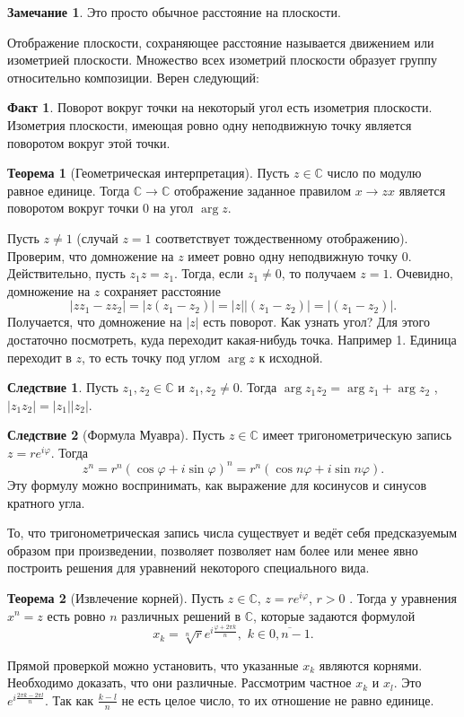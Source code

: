 \documentclass[10pt,a4paper,oneside]{book}
\theoremstyle{definition}
\newtheorem*{rem}{Замечание}
\newtheorem*{fact}{Факт}
\newtheorem{thm}{Теорема}
\newtheorem{cor}{Следствие}
\newcommand{\mb}[1]{\mathbb{#1}}
\newcommand{\ovl}{\overline}
\def\thrm{\begin{thm}}
\def\ethrm{\end{thm}}
\def\crl{\begin{cor}}
\def\ecrl{\end{cor}}
\def\rm{\begin{rem}}
\def\erm{\end{rem}}
\begin{document}
\rm Это просто обычное расстояние на плоскости.
\erm

Отображение плоскости, сохраняющее расстояние называется движением или изометрией плоскости. Множество всех изометрий плоскости образует группу относительно композиции. Верен следующий:
\begin{fact} Поворот вокруг точки на некоторый угол есть изометрия плоскости. Изометрия плоскости, имеющая ровно
одну неподвижную точку является поворотом вокруг этой точки.
\end{fact}

\thrm[Геометрическая интерпретация] Пусть $z\in \mb C$ число по модулю равное единице. Тогда $\mb C \to \mb C$ отображение заданное правилом $ x\to zx$   является поворотом вокруг точки 0 на угол $\arg z$.
\ethrm
\proof Пусть $z\neq 1$ (случай $z=1$ соответствует тождественному отображению). Проверим, что домножение на $z$ имеет ровно одну неподвижную точку 0. Действительно, пусть $z_1z=z_1$. Тогда, если $z_1\neq 0$, то получаем $z=1$. Очевидно, домножение на $z$ сохраняет расстояние $$|zz_1-zz_2|=|z(z_1-z_2)|=|z||(z_1-z_2)|=|(z_1-z_2)|.$$
Получается, что домножение на $|z|$ есть поворот. Как узнать угол? Для этого достаточно посмотреть, куда переходит какая-нибудь точка. Например 1. Единица переходит в $z$, то есть точку под углом $\arg z$ к исходной.
\endproof

\crl Пусть $z_1, z_2\in \mb C$  и $z_1,z_2\neq 0$. Тогда $\arg z_1z_2 = \arg z_1 + \arg z_2$ , $|z_1z_2| = |z_1 ||z_2 |$.
\ecrl

\crl[Формула Муавра] Пусть $z\in \mb C$ имеет тригонометрическую запись $z=re^{i\varphi}$. Тогда
$$z^{n}=r^{n}(\cos \varphi +i\sin \varphi )^{n}=r^{n}(\cos n\varphi +i\sin n\varphi ).$$
Эту формулу можно воспринимать, как выражение для косинусов и синусов кратного угла.
\ecrl

То, что тригонометрическая запись числа существует и ведёт себя предсказуемым образом при произведении, позволяет позволяет нам более или менее явно построить решения для уравнений некоторого специального вида.

\thrm[Извлечение корней] Пусть $z\in \mb C$, $z=re^{i\varphi}$, $r>0$ . Тогда у уравнения $x^n=z$ есть ровно $n$ различных
решений в $\mb C$, которые задаются формулой
$$ x_k =\sqrt[n]{r} e^{i\frac{\varphi + 2\pi k}{n}} ,\,\, k\in \ovl{0,n-1}.$$
\ethrm
\proof
Прямой проверкой можно установить, что указанные $x_k$ являются корнями. Необходимо доказать, что они различные. Рассмотрим частное $x_k$ и $x_l$. Это $e^{i\frac{ 2\pi k- 2\pi l}{n}}$. Так как $\frac{k-l}{n}$ не есть целое число, то их отношение не равно единице.
\endproof
\end{document}
